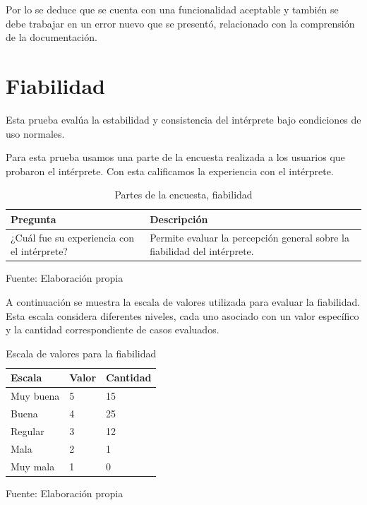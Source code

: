 Por lo se deduce que se cuenta con una funcionalidad aceptable y también se debe trabajar en un error nuevo que se presentó, relacionado con la comprensión de la documentación.

\section{Fiabilidad}
Esta prueba evalúa la estabilidad y consistencia del intérprete bajo condiciones de uso normales.

Para esta prueba usamos una parte de la encuesta realizada a los usuarios que probaron el intérprete. Con esta calificamos la experiencia con el intérprete.
\begin{table}[!h]
  \begin{center}
    \begin{tabularx}{0.9\textwidth}{|X|X|}
      \hline
      \textbf{Pregunta} & \textbf{Descripción} \\
      \hline
      ¿Cuál fue su experiencia con el intérprete? & Permite evaluar la percepción general sobre la fiabilidad del intérprete. \\
      \hline
    \end{tabularx}
  \end{center}
  \caption{Partes de la encuesta, fiabilidad}
  \centering Fuente: Elaboración propia
  \label{tab:fiabilidad}
\end{table}

A continuación se muestra la escala de valores utilizada para evaluar la fiabilidad. Esta escala considera diferentes niveles, cada uno asociado con un valor específico y la cantidad correspondiente de casos evaluados.
\begin{table}[!h]
  \begin{center}
    \begin{tabularx}{0.9\textwidth}{|X|X|X|}
      \hline
      \textbf{Escala} & \textbf{Valor} & \textbf{Cantidad} \\
      \hline
      Muy buena & 5 & 15 \\
      \hline
      Buena & 4 & 25 \\
      \hline
      Regular & 3 & 12 \\
      \hline
      Mala & 2 & 1 \\
      \hline
      Muy mala & 1 & 0 \\
      \hline
    \end{tabularx}
  \end{center}
  \caption{Escala de valores para la fiabilidad}
  \centering Fuente: Elaboración propia
  \label{tab:fiabilidad-escala}
\end{table}

